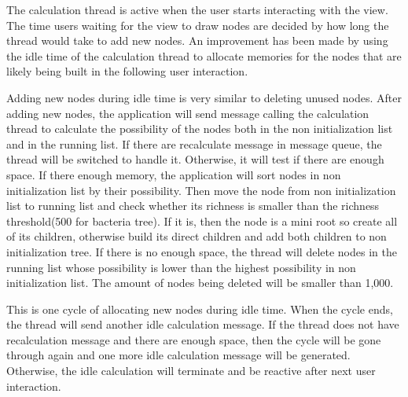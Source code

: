 \documentclass[a4paper,11pt,twoside]{report}
\begin{document}
The calculation thread is active when the user starts interacting with the view. The time users waiting for the view to draw nodes are decided by how long the thread would take to add new nodes. An improvement has been made by using the idle time of the calculation thread to allocate memories for the nodes that are likely being built in the following user interaction. 

Adding new nodes during idle time is very similar to deleting unused nodes. After adding new nodes, the application will send message calling the calculation thread to calculate the possibility of the nodes both in the non initialization list and in the running list. If there are recalculate message in message queue, the thread will be switched to handle it. Otherwise, it will test if there are enough space. If there enough memory, the application will sort nodes in non initialization list by their possibility. Then move the node from non initialization list to running list and check whether its richness is smaller than the richness threshold(500 for bacteria tree). If it is, then the node is a mini root so create all of its children, otherwise build its direct children and add both children to non initialization tree. If there is no enough space, the thread will delete nodes in the running list whose possibility is lower than the highest possibility in non initialization list. The amount of nodes being deleted will be smaller than 1,000.

This is one cycle of allocating new nodes during idle time. When the cycle ends, the thread will send another idle calculation message. If the thread does not have recalculation message and there are enough space, then the cycle will be gone through again and one more idle calculation message will be generated. Otherwise, the idle calculation will terminate and be reactive after next user interaction.
\end{document}

